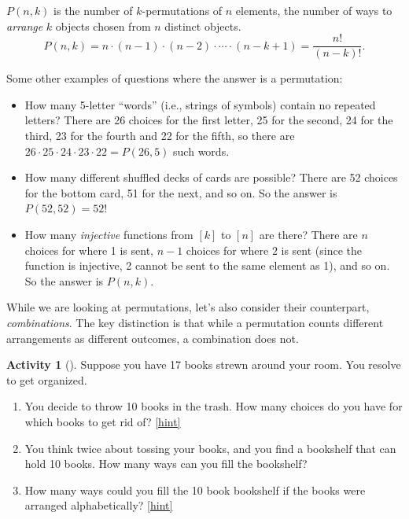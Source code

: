 \documentclass[10pt,]{book}
\theoremstyle{plain}
\theoremstyle{definition}
\theoremstyle{definition}
\theoremstyle{definition}
\newtheorem{activity}[project]{Activity}
\numberwithin{equation}{chapter}
\begin{document}
\begin{assemblage}\label{assemblage-permutation}
\hypertarget{p-652}{}%
\(P(n,k)\) is the number of \(k\)-permutations of \(n\) elements, the number of ways to \emph{arrange} \(k\) objects chosen from \(n\) distinct objects.%
\begin{equation*}
P(n,k) = n\cdot (n-1) \cdot (n-2) \cdot \cdots \cdot (n-k+1) = \frac{n!}{(n-k)!}.
\end{equation*}
%
\end{assemblage}
\hypertarget{p-653}{}%
Some other examples of questions where the answer is a permutation: \leavevmode%
\begin{itemize}[label=\textbullet]
\item{}\hypertarget{p-654}{}%
How many 5-letter ``words'' (i.e., strings of symbols) contain no repeated letters?  There are 26 choices for the first letter, 25 for the second, 24 for the third, 23 for the fourth and 22 for the fifth, so there are \(26\cdot 25 \cdot 24 \cdot 23 \cdot 22 = P(26,5)\) such words.%
\item{}\hypertarget{p-655}{}%
How many different shuffled decks of cards are possible?  There are 52 choices for the bottom card, 51 for the next, and so on.  So the answer is \(P(52,52) = 52!\)%
\item{}\hypertarget{p-656}{}%
How many \emph{injective} functions from \([k]\) to \([n]\) are there?  There are \(n\) choices for where 1 is sent, \(n-1\) choices for where \(2\) is sent (since the function is injective, 2 cannot be sent to the same element as 1), and so on.  So the answer is \(P(n,k)\).%
\end{itemize}
%
\par
\hypertarget{p-657}{}%
While we are looking at permutations, let's also consider their counterpart, \emph{combinations}. The key distinction is that while a permutation counts different arrangements as different outcomes, a combination does not.%
\begin{activity}[]\label{activity-84}
\hypertarget{p-658}{}%
Suppose you have 17 books strewn around your room.  You resolve to get organized.%
\begin{enumerate}[font=\bfseries,label=(\alph*),ref=\alph*]
\item\label{task-133} \hypertarget{p-659}{}%
You decide to throw 10 books in the trash.  How many choices do you have for which books to get rid of?%
\hfill{\tiny\hyperlink{a-91.a}{[hint]}\hypertarget{q-91.a}{}}\item\label{task-134} \hypertarget{p-661}{}%
You think twice about tossing your books, and you find a bookshelf that can hold 10 books.  How many ways can you fill the bookshelf?%
\item\label{task-135} \hypertarget{p-662}{}%
How many ways could you fill the 10 book bookshelf if the books were arranged alphabetically?%
\hfill{\tiny\hyperlink{a-91.c}{[hint]}\hypertarget{q-91.c}{}}\end{enumerate}
\end{activity}
\end{document}
